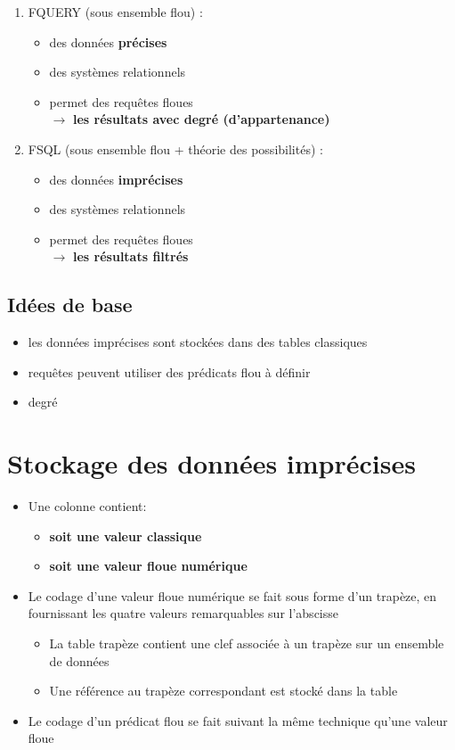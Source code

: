 \documentclass[a4paper,11pt]{article}
\begin{document}
\begin{enumerate}
\item FQUERY (sous ensemble flou) : \\
	\begin{itemize}
	\item des données \textbf{précises}
	\item des systèmes relationnels
	\item permet des requêtes floues\\
	$\longrightarrow$ \textbf{les résultats avec degré (d'appartenance)}
\end{itemize}

\item FSQL (sous ensemble flou + théorie des possibilités) : \\
	\begin{itemize}
	\item des données \textbf{imprécises}
	\item des systèmes relationnels
	\item permet des requêtes floues\\
	$\longrightarrow$ \textbf{les résultats filtrés}
\end{itemize}

\end{enumerate}

\subsection{Idées de base}
\begin{itemize}
	\item les données imprécises sont stockées dans des tables classiques
	\item requêtes peuvent utiliser des prédicats flou à définir
	\item degré
\end{itemize}


\section{Stockage des données imprécises}
\begin{itemize}
\item Une colonne contient:
\begin{itemize}
\item \textbf{soit une valeur classique}
\item \textbf{soit une valeur floue numérique}
\end{itemize}
\item Le codage d'une valeur floue numérique se fait sous forme d'un trapèze, en fournissant les quatre valeurs remarquables sur l'abscisse
\begin{itemize}
\item La table trapèze contient une clef associée à un trapèze sur un ensemble de données
\item Une référence au trapèze correspondant est stocké dans la table
\end{itemize}
\item Le codage d'un prédicat flou se fait suivant la même technique qu'une valeur floue
\end{itemize}
\end{document}
